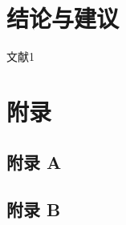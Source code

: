 \documentclass[zihao=5, UTF8]{ctexart}
\begin{document}
\section{结论与建议}

\newpage
{}
\begin{thebibliography}{99}
 文献1 
\end{thebibliography}

\newpage
{}
	\section*{附录}
	\subsection*{附录 A}

	\subsection*{附录 B}
\end{document}
